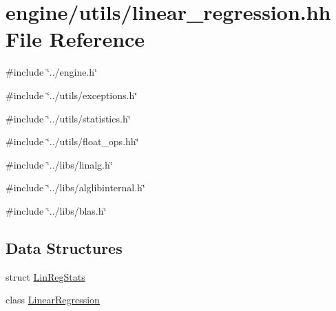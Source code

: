 \hypertarget{linear__regression_8hh}{
\section{engine/utils/linear\_\-regression.hh File Reference}
\label{linear__regression_8hh}
}
{\ttfamily \#include \char`\"{}../engine.h\char`\"{}}\par
{\ttfamily \#include \char`\"{}../utils/exceptions.h\char`\"{}}\par
{\ttfamily \#include \char`\"{}../utils/statistics.h\char`\"{}}\par
{\ttfamily \#include \char`\"{}../utils/float\_\-ops.hh\char`\"{}}\par
{\ttfamily \#include \char`\"{}../libs/linalg.h\char`\"{}}\par
{\ttfamily \#include \char`\"{}../libs/alglibinternal.h\char`\"{}}\par
{\ttfamily \#include \char`\"{}../libs/blas.h\char`\"{}}\par
\subsection*{Data Structures}
\begin{DoxyCompactItemize}
\item 
struct \hyperlink{structLinRegStats}{LinRegStats}
\item 
class \hyperlink{classLinearRegression}{LinearRegression}
\end{DoxyCompactItemize}
